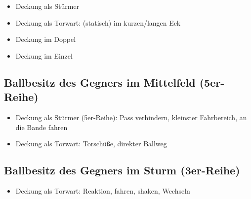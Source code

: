 \begin{itemize}
\item Deckung als Stürmer
\item Deckung als Torwart: (statisch) im kurzen/langen Eck
\item Deckung im Doppel
\item Deckung im Einzel
\end{itemize}


\subsection{Ballbesitz des Gegners im Mittelfeld (5er-Reihe)}
\label{technik:defensive:gegnermittelfeld}

\begin{itemize}
\item Deckung als Stürmer (5er-Reihe): Pass verhindern, kleinster Fahrbereich, an die Bande fahren
\item Deckung als Torwart: Torschüße, direkter Ballweg
\end{itemize}


\subsection{Ballbesitz des Gegners im Sturm (3er-Reihe)}
\label{technik:defensive:gegnersturm}

\begin{itemize}
\item Deckung als Torwart: Reaktion, fahren, shaken, Wechseln
\end{itemize}

